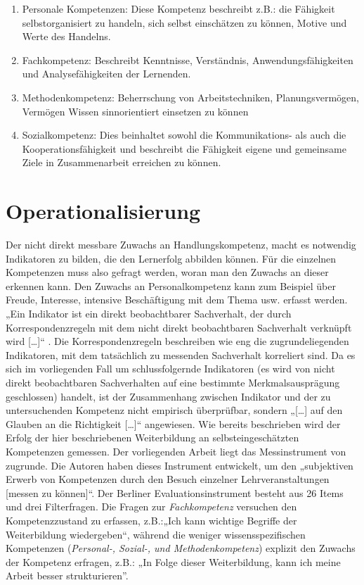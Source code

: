 \documentclass[12pt, bibliography=totoc]{scrartcl}
\begin{document}
\begin{enumerate}
\def\labelenumi{\arabic{enumi}.}
\item
  Personale Kompetenzen: Diese Kompetenz beschreibt z.B.: die Fähigkeit
  selbstorganisiert zu handeln, sich selbst einschätzen zu können,
  Motive und Werte des Handelns.
\item
  Fachkompetenz: Beschreibt Kenntnisse, Verständnis,
  Anwendungsfähigkeiten und Analysefähigkeiten der Lernenden.
\item
  Methodenkompetenz: Beherrschung von Arbeitstechniken,
  Planungsvermögen, Vermögen Wissen sinnorientiert einsetzen zu können
\item
  Sozialkompetenz: Dies beinhaltet sowohl die Kommunikations- als auch
  die Kooperationsfähigkeit und beschreibt die Fähigkeit eigene und
  gemeinsame Ziele in Zusammenarbeit erreichen zu können.
\end{enumerate}

\section{Operationalisierung}\label{operationalisierung}

Der nicht direkt messbare Zuwachs an Handlungskompetenz, macht es
notwendig Indikatoren zu bilden, die den Lernerfolg abbilden können. Für
die einzelnen Kompetenzen muss also gefragt werden, woran man den
Zuwachs an dieser erkennen kann. Den Zuwachs an Personalkompetenz kann
zum Beispiel über Freude, Interesse, intensive Beschäftigung mit dem
Thema usw. erfasst werden. „Ein Indikator ist ein direkt beobachtbarer
Sachverhalt, der durch Korrespondenzregeln mit dem nicht direkt
beobachtbaren Sachverhalt verknüpft wird {[}\ldots{]}``
\parencite[85]{Kromrey2009}. Die Korrespondenzregeln beschreiben wie eng
die zugrundeliegenden Indikatoren, mit dem tatsächlich zu messenden
Sachverhalt korreliert sind. Da es sich im vorliegenden Fall um
schlussfolgernde Indikatoren (es wird von nicht direkt beobachtbaren
Sachverhalten auf eine bestimmte Merkmalsausprägung geschlossen)
handelt, ist der Zusammenhang zwischen Indikator und der zu
untersuchenden Kompetenz nicht empirisch überprüfbar, sondern
„{[}\ldots{]} auf den Glauben an die Richtigkeit {[}\ldots{]}``
\parencite[166]{Kromrey2009} angewiesen. Wie bereits beschrieben wird
der Erfolg der hier beschriebenen Weiterbildung an selbsteingeschätzten
Kompetenzen gemessen. Der vorliegenden Arbeit liegt das Messinstrument
von \textcite{Braun2008} zugrunde. Die Autoren haben dieses Instrument
entwickelt, um den „subjektiven Erwerb von Kompetenzen durch den Besuch
einzelner Lehrveranstaltungen {[}messen zu
können{]}``\parencite[30]{Braun2008}. Der Berliner Evaluationsinstrument
besteht aus 26 Items und drei Filterfragen. Die Fragen zur
\emph{Fachkompetenz} versuchen den Kompetenzzustand zu erfassen,
z.B.:„Ich kann wichtige Begriffe der Weiterbildung wiedergeben\enquote{,
während die weniger wissensspezifischen Kompetenzen (\emph{Personal-,
Sozial-, und Methodenkompetenz}) explizit den Zuwachs der Kompetenz
erfragen, z.B.: „In Folge dieser Weiterbildung, kann ich meine Arbeit
besser strukturieren}.
\end{document}
